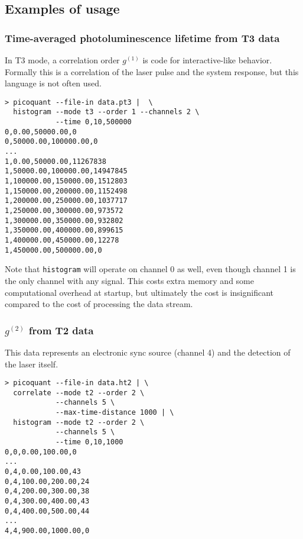 \documentclass{article}
\newcommand{\gn}[1]{\ensuremath{g^{(#1)}}}
\begin{document}
\subsection{Examples of usage}
\label{sec:histogram_examples}
\subsubsection{Time-averaged photoluminescence lifetime from T3 data}
In T3 mode, a correlation order \gn{1} is code for interactive-like behavior. Formally this is a correlation of the laser pulse and the system response, but this language is not often used.
\begin{verbatim}
> picoquant --file-in data.pt3 |  \
  histogram --mode t3 --order 1 --channels 2 \
            --time 0,10,500000
0,0.00,50000.00,0
0,50000.00,100000.00,0
...
1,0.00,50000.00,11267838
1,50000.00,100000.00,14947845
1,100000.00,150000.00,1512803
1,150000.00,200000.00,1152498
1,200000.00,250000.00,1037717
1,250000.00,300000.00,973572
1,300000.00,350000.00,932802
1,350000.00,400000.00,899615
1,400000.00,450000.00,12278
1,450000.00,500000.00,0
\end{verbatim}
Note that \texttt{histogram} will operate on channel 0 as well, even though channel 1 is the only channel with any signal. This costs extra memory and some computational overhead at startup, but ultimately the cost is insignificant compared to the cost of processing the data stream.

\subsubsection{\gn{2} from T2 data}
This data represents an electronic sync source (channel 4) and the detection of the laser itself.
\begin{verbatim}
> picoquant --file-in data.ht2 | \
  correlate --mode t2 --order 2 \
            --channels 5 \
            --max-time-distance 1000 | \
  histogram --mode t2 --order 2 \
            --channels 5 \
            --time 0,10,1000
0,0,0.00,100.00,0
...
0,4,0.00,100.00,43
0,4,100.00,200.00,24
0,4,200.00,300.00,38
0,4,300.00,400.00,43
0,4,400.00,500.00,44
...
4,4,900.00,1000.00,0
\end{verbatim}
\end{document}
